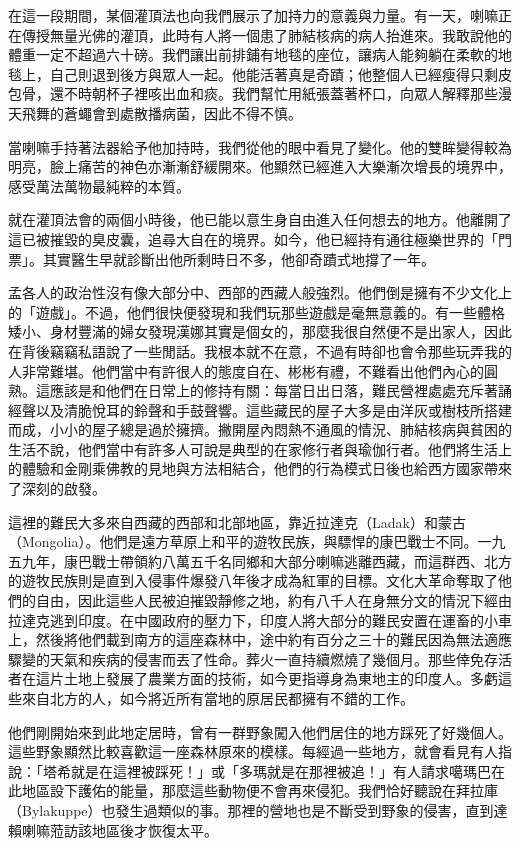 在這一段期間，某個灌頂法也向我們展示了加持力的意義與力量。有一天，喇嘛正在傳授無量光佛的灌頂，此時有人將一個患了肺結核病的病人抬進來。我敢說他的體重一定不超過六十磅。我們讓出前排鋪有地毯的座位，讓病人能夠躺在柔軟的地毯上，自己則退到後方與眾人一起。他能活著真是奇蹟；他整個人已經瘦得只剩皮包骨，還不時朝杯子裡咳出血和痰。我們幫忙用紙張蓋著杯口，向眾人解釋那些漫天飛舞的蒼蠅會到處散播病菌，因此不得不慎。

當喇嘛手持著法器給予他加持時，我們從他的眼中看見了變化。他的雙眸變得較為明亮，臉上痛苦的神色亦漸漸舒緩開來。他顯然已經進入大樂漸次增長的境界中，感受萬法萬物最純粹的本質。

就在灌頂法會的兩個小時後，他已能以意生身自由進入任何想去的地方。他離開了這已被摧毀的臭皮囊，追尋大自在的境界。如今，他已經持有通往極樂世界的「門票」。其實醫生早就診斷出他所剩時日不多，他卻奇蹟式地撐了一年。

孟各人的政治性沒有像大部分中、西部的西藏人般強烈。他們倒是擁有不少文化上的「遊戲」。不過，他們很快便發現和我們玩那些遊戲是毫無意義的。有一些體格矮小、身材豐滿的婦女發現漢娜其實是個女的，那麼我很自然便不是出家人，因此在背後竊竊私語說了一些閒話。我根本就不在意，不過有時卻也會令那些玩弄我的人非常難堪。他們當中有許很人的態度自在、彬彬有禮，不難看出他們內心的圓熟。這應該是和他們在日常上的修持有關：每當日出日落，難民營裡處處充斥著誦經聲以及清脆悅耳的鈴聲和手鼓聲響。這些藏民的屋子大多是由洋灰或樹枝所搭建而成，小小的屋子總是過於擁擠。撇開屋內悶熱不通風的情況、肺結核病與貧困的生活不說，他們當中有許多人可說是典型的在家修行者與瑜伽行者。他們將生活上的體驗和金剛乘佛教的見地與方法相結合，他們的行為模式日後也給西方國家帶來了深刻的啟發。

這裡的難民大多來自西藏的西部和北部地區，靠近拉達克（Ladak）和蒙古（Mongolia）。他們是遠方草原上和平的遊牧民族，與驃悍的康巴戰士不同。一九五九年，康巴戰士帶領約八萬五千名同鄉和大部分喇嘛逃離西藏，而這群西、北方的遊牧民族則是直到入侵事件爆發八年後才成為紅軍的目標。文化大革命奪取了他們的自由，因此這些人民被迫摧毀靜修之地，約有八千人在身無分文的情況下經由拉達克逃到印度。在中國政府的壓力下，印度人將大部分的難民安置在運畜的小車上，然後將他們載到南方的這座森林中，途中約有百分之三十的難民因為無法適應驟變的天氣和疾病的侵害而丟了性命。葬火一直持續燃燒了幾個月。那些倖免存活者在這片土地上發展了農業方面的技術，如今更指導身為東地主的印度人。多虧這些來自北方的人，如今將近所有當地的原居民都擁有不錯的工作。

他們剛開始來到此地定居時，曾有一群野象闖入他們居住的地方踩死了好幾個人。這些野象顯然比較喜歡這一座森林原來的模樣。每經過一些地方，就會看見有人指說：「塔希就是在這裡被踩死！」或「多瑪就是在那裡被追！」有人請求噶瑪巴在此地區設下護佑的能量，那麼這些動物便不會再來侵犯。我們恰好聽說在拜拉庫（Bylakuppe）也發生過類似的事。那裡的營地也是不斷受到野象的侵害，直到達賴喇嘛蒞訪該地區後才恢復太平。

